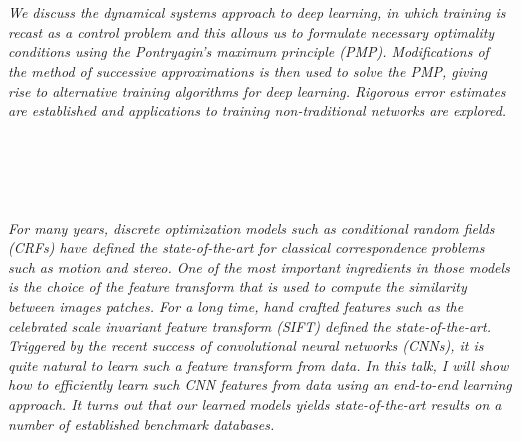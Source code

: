\begin{multicols}{2}
        \\
        \\\\
        \\
        \\\\
\\
      \textit{We discuss the dynamical systems approach to deep learning, in which training is recast as a control problem and this allows us to formulate necessary optimality conditions using the Pontryagin’s maximum principle (PMP). Modifications of the method of successive approximations is then used to solve the PMP, giving rise to alternative training algorithms for deep learning. Rigorous error estimates are established and applications to training non-traditional networks are explored. }\\
\\ 
        \\
        \\\\
\\
      \textit{For many years, discrete optimization models such as conditional random fields (CRFs) have defined the state-of-the-art for classical correspondence problems such as motion and stereo. One of the most important ingredients in those models is the choice of the feature transform that is used to compute the similarity between images patches. For a long time, hand crafted features such as the celebrated scale invariant feature transform (SIFT) defined the state-of-the-art. Triggered by the recent success of convolutional neural networks (CNNs), it is quite natural to learn such a feature transform from data. In this talk, I will show how to efficiently learn such CNN features from data using an end-to-end learning approach. It turns out that our learned models yields state-of-the-art results on a number of established benchmark databases.}\\
\\ 
        \\
        \\\\
        \\
        \\\\
        \\
        \\\\
        \\
        \\\\
        \\
        \\\\
\\
\end{multicols}
